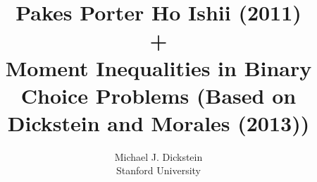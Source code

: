 %
%
%
%


\def\beamerclassoptions{[notes=show]}

\usepackage{mathpazo}
\usepackage{hyperref}


\usepackage{graphicx}
\usepackage[latin1]{inputenc}
\usepackage{listings}
\usepackage{amsmath}
\usepackage{amsfonts}
\usepackage{amsxtra}
\usepackage{amstext}
\usepackage{amssymb}
\usepackage{latexsym}
\usepackage{subfigure}
\usepackage{eurosym}
\linespread{1.2}
\usepackage{multimedia}
\usepackage{dsfont} %
\usepackage{graphicx}
\usepackage{color,colortbl}
\usepackage{multirow}
\usepackage{bbm}


\newenvironment{stepenumerate}{\begin{enumerate}[<+->]}{\end{enumerate}}
\newenvironment{stepitemize}{\begin{itemize}[<+->]}{\end{itemize} }
\newenvironment{stepenumeratewithalert}{\begin{enumerate}[<+-| alert@+>]}{\end{enumerate}}
\newenvironment{stepitemizewithalert}{\begin{itemize}[<+-| alert@+>]}{\end{itemize} }

%



\title[Moment Inequalities]{Pakes Porter Ho Ishii (2011)\\ + \\Moment Inequalities in Binary Choice Problems (Based on Dickstein and Morales (2013))}
\author[MJ Dickstein]{Michael J. Dickstein \\
Stanford University}
\maketitle


